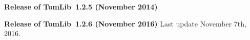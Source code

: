 \bigskip
{\bf Release of TomLib~1.2.5 (November 2014)}

\bigskip
{\bf Release of TomLib~1.2.6 (November 2016)}
\bigbreak
Last update November 7th, 2016.

\bye


